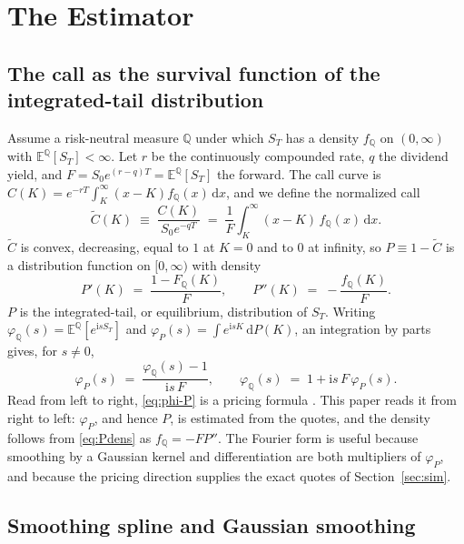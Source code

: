 \documentclass[preprint,12pt,authoryear,times]{elsarticle}
\newcommand{\E}{\mathbb{E}}
\newcommand{\Q}{\mathbb{Q}}
\newcommand{\Ct}{\tilde C}
\begin{document}
\section{The Estimator}
\label{sec:est}

\subsection{The call as the survival function of the integrated-tail distribution}
\label{sec:construct}

Assume a risk-neutral measure \(\Q\) under which \(S_T\) has a density \(f_{\Q}\) on \((0,\infty)\) with \(\E^{\Q}[S_T]<\infty\). Let \(r\) be the continuously compounded rate, \(q\) the dividend yield, and \(F=S_0e^{(r-q)T}=\E^{\Q}[S_T]\) the forward. The call curve is \(C(K)=e^{-rT}\int_K^{\infty}(x-K)f_{\Q}(x)\,\mathrm{d}x\), and we define the normalized call
\begin{equation}
\label{eq:Ctil}
\Ct(K)
\;\equiv\;
\frac{C(K)}{S_0e^{-qT}}
\;=\;
\frac1F\int_K^{\infty}(x-K)\,f_{\Q}(x)\,\mathrm{d}x .
\end{equation}
\(\Ct\) is convex, decreasing, equal to \(1\) at \(K=0\) and to \(0\) at infinity, so \(P\equiv 1-\Ct\) is a distribution function on \([0,\infty)\) with density
\begin{equation}
\label{eq:Pdens}
P'(K)\;=\;\frac{1-F_{\Q}(K)}{F},
\qquad
P''(K)\;=\;-\frac{f_{\Q}(K)}{F}.
\end{equation}
\(P\) is the integrated-tail, or equilibrium, distribution of \(S_T\). Writing \(\varphi_{\Q}(s)=\E^{\Q}[e^{\mathrm{i}sS_T}]\) and \(\varphi_P(s)=\int e^{\mathrm{i}sK}\,\mathrm{d}P(K)\), an integration by parts gives, for \(s\neq 0\),
\begin{equation}
\label{eq:phi-P}
\varphi_P(s)\;=\;\frac{\varphi_{\Q}(s)-1}{\mathrm{i}s\,F},
\qquad
\varphi_{\Q}(s)\;=\;1+\mathrm{i}s\,F\,\varphi_P(s).
\end{equation}
Read from left to right, \eqref{eq:phi-P} is a pricing formula \citep{lewis2000}. This paper reads it from right to left: \(\varphi_P\), and hence \(P\), is estimated from the quotes, and the density follows from \eqref{eq:Pdens} as \(f_{\Q}=-FP''\). The Fourier form is useful because smoothing by a Gaussian kernel and differentiation are both multipliers of \(\varphi_P\), and because the pricing direction supplies the exact quotes of Section~\ref{sec:sim}.

\subsection{Smoothing spline and Gaussian smoothing}
\label{sec:spline}
\end{document}
